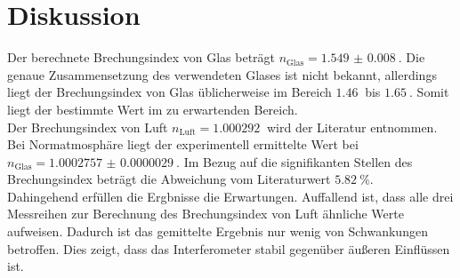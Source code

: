 \section{Diskussion}
\label{sec:Diskussion}

Der berechnete Brechungsindex von Glas beträgt $n_\text{Glas} = \qty{1.549(8)}{}$.
Die genaue Zusammensetzung des verwendeten Glases ist nicht bekannt, allerdings liegt der Brechungsindex von Glas üblicherweise im Bereich $\qty{1.46}{}$ bis $\qty{1.65}{}$.\cite{index}
Somit liegt der bestimmte Wert im zu erwartenden Bereich.
\\
Der Brechungsindex von Luft $n_\text{Luft} = \qty{1.000292}{}$ wird der Literatur entnommen.
Bei Normatmosphäre liegt der experimentell ermittelte Wert bei $n_\text{Glas} = \qty{1.0002757(29)}{}$.
Im Bezug auf die signifikanten Stellen des Brechungsindex beträgt die Abweichung vom Literaturwert $\qty{5.82}{\percent}$.
\\
Dahingehend erfüllen die Ergbnisse die Erwartungen. 
Auffallend ist, dass alle drei Messreihen zur Berechnung des Brechungsindex von Luft ähnliche Werte aufweisen.
Dadurch ist das gemittelte Ergebnis nur wenig von Schwankungen betroffen.
Dies zeigt, dass das Interferometer stabil gegenüber äußeren Einflüssen ist.
